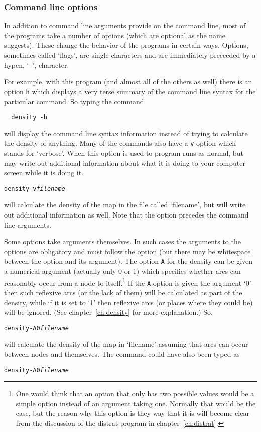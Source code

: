 \documentclass[%
	11pt,
        a4paper,
        twoside]{workrep}
\newcommand*{\prg}[1]{\textsf{#1}}		%
\begin{document}
\subsubsection{Command line options} \label{sec:options}
In addition to command line arguments provide on the command line,
most of the programs take a number of options (which are optional
as the name suggests).  These change the behavior of the programs
in certain ways.  Options, sometimes called `flags', are single characters
and are immediately preceeded by a hypen, `\texttt{-}', character.

For example, with this program (and almost all of the others as well)
there is an option \texttt{h} which displays a very terse summary
of the command line syntax for the particular command.  So typing the
command
\begin{verbatim}
  density -h
\end{verbatim}
will display the command line syntax information instead of trying
to calculate the density of anything.  Many of the commands also have
a \texttt{v} option which stands for `verbose'.  When this option is used
to program runs as normal, but may write out additional information about
what it is doing to your computer screen while it is doing it.
\begin{alltt}
  density -v \emph{filename}
\end{alltt}
will calculate the density of the map in the file called `filename', but
will write out additional information as well.  Note that the option
precedes the command line arguments.

Some options take arguments themselves.  In such cases the arguments to
the options are obligatory and must follow the option (but there may
be whitespace between the option and its argument).  The option \texttt{A}
for the density can be given a numerical argument (actually only
0 or 1) which specifies whether arcs can reasonably occur from a node
to itself.\footnote{%
  One would think that an option that only has two possible values would
  be a simple option instead of an argument taking one.  Normally that
  would be the case, but the reason why this option is they way that it
  is will become clear from the discussion of the \prg{distrat} program
  in chapter~\ref{ch:distrat}.}
If the \texttt{A} option is
given the argument `0' then such reflexive arcs (or the lack of them) will
be calculated as part of the density, while if it is set to `1' then
reflexive arcs (or places where they could be) will be ignored.
(See chapter~\ref{ch:density} for more explanation.)  So,
\begin{alltt}
  density -A 0 \emph{filename}
\end{alltt}
will calculate the density of the map in `filename' assuming that arcs
can occur between nodes and themselves.  The command could have
also been typed as
\begin{alltt}
  density -A0 \emph{filename}
\end{alltt}
\end{document}

